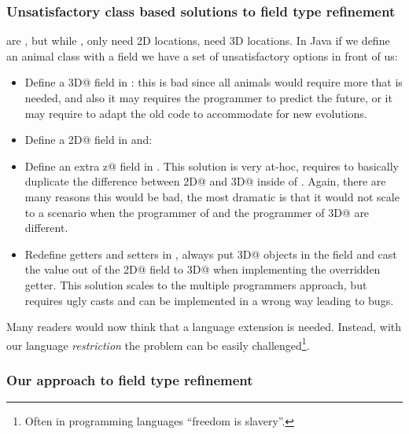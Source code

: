 \subsubsection*{Unsatisfactory class based solutions to field type refinement}

\Q@Bird@s are \Q@Animal@s, 
but while \Q@Animal@s, only need 2D locations,
\Q@Bird@s need  3D locations.
In Java if we define an animal class with a field we have a set of unsatisfactory options in front of us:
\begin{itemize}
\item Define a \Q@Point3D@ field in \Q@Animal@:
this is bad since all animals would require more that is needed, and also it may requires the programmer to predict the future, or it may require to adapt the old code to accommodate for new evolutions.
\item Define a \Q@Point2D@ field in \Q@Animal@ and:
\item Define an extra \Q@int z@ field in \Q@Bird@.
This solution is very at-hoc, requires to basically duplicate the difference between \Q@Point2D@ and \Q@Point3D@ inside of \mbox{\Q@Bird@}.
Again, there are many reasons this would be bad, the most dramatic is that it would not scale to a scenario when the programmer of \Q@Bird@ and the programmer of \Q@Point3D@ are different.
\item Redefine getters and setters in \Q@Bird@, always put \Q@Point3D@ objects in the field and cast
the value out of the \Q@Point2D@ field to \Q@Point3D@ when implementing the overridden getter.
This solution scales to the multiple programmers approach, but requires ugly casts and can be implemented in a wrong way leading to bugs.
\end{itemize}

Many readers would now think that a language extension is needed.
Instead, with our language \emph{restriction} the problem can be easily challenged\footnote{Often in programming languages ``freedom is slavery''.}.
\subsubsection*{Our approach to field type refinement}



